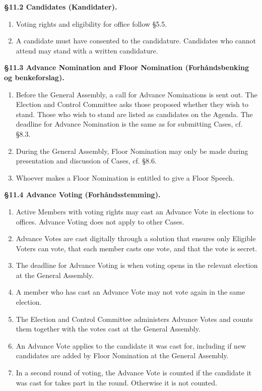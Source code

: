 \documentclass{../../../Common/Latex/Templates/rapport}
\begin{document}
\textbf{\S 11.2 Candidates (Kandidater).}
\begin{enumerate}
  \item Voting rights and eligibility for office follow \S5.5.
  \item A candidate must have consented to the candidature. Candidates who cannot attend may stand with a written candidature.
\end{enumerate}

\textbf{\S 11.3 Advance Nomination and Floor Nomination (Forhåndsbenking og benkeforslag).}
\begin{enumerate}
  \item Before the General Assembly, a call for Advance Nominations is sent out. The Election and Control Committee asks those proposed whether they wish to stand. Those who wish to stand are listed as candidates on the Agenda. The deadline for Advance Nomination is the same as for submitting Cases, cf. \S8.3.
  \item During the General Assembly, Floor Nomination may only be made during presentation and discussion of Cases, cf. \S8.6.
  \item Whoever makes a Floor Nomination is entitled to give a Floor Speech.
\end{enumerate}

\textbf{\S 11.4 Advance Voting (Forhåndsstemming).}
\begin{enumerate}
  \item Active Members with voting rights may cast an Advance Vote in elections to offices. Advance Voting does not apply to other Cases.
  \item Advance Votes are cast digitally through a solution that ensures only Eligible Voters can vote, that each member casts one vote, and that the vote is secret.
  \item The deadline for Advance Voting is when voting opens in the relevant election at the General Assembly.
  \item A member who has cast an Advance Vote may not vote again in the same election.
  \item The Election and Control Committee administers Advance Votes and counts them together with the votes cast at the General Assembly.
  \item An Advance Vote applies to the candidate it was cast for, including if new candidates are added by Floor Nomination at the General Assembly.
  \item In a second round of voting, the Advance Vote is counted if the candidate it was cast for takes part in the round. Otherwise it is not counted.
\end{enumerate}
\end{document}
